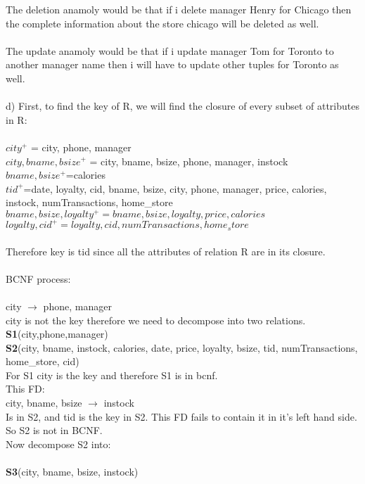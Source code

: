 \documentclass{article}
\begin{document}
\begin{enumerate}
		The deletion anamoly would be that if i delete manager Henry for Chicago then the complete information about the store chicago will be deleted as well.\\\\
		The update anamoly would be that if i update manager Tom for Toronto to another manager name then i will have to update other tuples for Toronto as well.
		\\\\
	d) First, to find the key of R, we will find the closure of every subset of attributes in R:\\\\
	$city^{+}$ = city, phone, manager\\
	  $city,bname,bsize^{+}$ = city, bname, bsize, phone, manager, instock\\
	  $bname,bsize^{+}$=calories\\
	  $tid^{+}$=date, loyalty, cid, bname, bsize, city, phone, manager, price, calories, instock, numTransactions, home\_store\\
	  $bname,bsize,loyalty^{+}=bname,bsize,loyalty,price,calories$\\
	  $loyalty,cid^{+}=loyalty,cid,numTransactions,home_store$\\\\
	  Therefore key is tid since all the attributes of relation R are in its closure.\\\\
	  BCNF process:\\\\
	  city $\rightarrow$ phone, manager\\
	  city is not the key therefore we need to decompose into two relations.\\
	  \textbf{S1}(city,phone,manager)\\
	  \textbf{S2}(city, bname, instock, calories, date, price, loyalty, bsize, tid, numTransactions, home\_store, cid)\\
	  For S1 city is the key and therefore S1 is in bcnf.\\
	  This FD:\\
	  city, bname, bsize $\rightarrow$ instock\\
		  Is in S2, and tid is the key in S2. This FD fails to contain it in it's left hand side. So S2 is not in BCNF.\\
		  Now decompose S2 into: \\\\
	  \textbf{S3}(city, bname, bsize, instock)\\

\end{enumerate}
\end{document}
